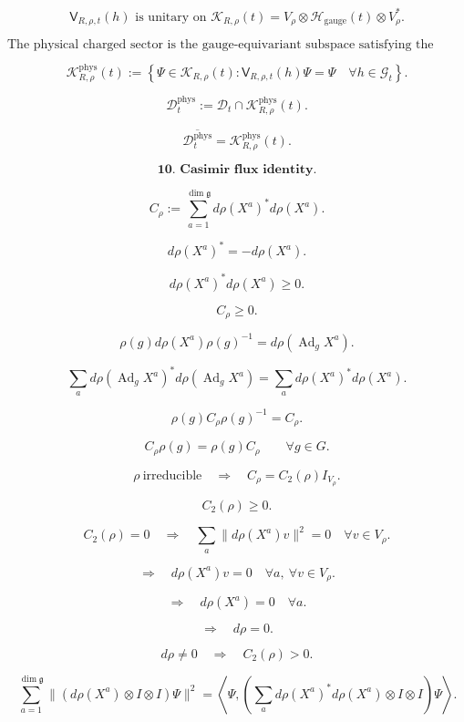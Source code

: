 \documentclass[11pt]{article}
\begin{document}
\[
\mathsf V_{R,\rho,t}(h)
\text{ is unitary on }
\mathcal K_{R,\rho}(t)
=
V_\rho\otimes\mathcal H_{\mathrm{gauge}}(t)\otimes V_\rho^\ast.
\]

\[
\text{The physical charged sector is the gauge-equivariant subspace satisfying the gauge constraint.}
\]

\[
\mathcal K_{R,\rho}^{\mathrm{phys}}(t)
:=
\left\{
\Psi\in \mathcal K_{R,\rho}(t):
\mathsf V_{R,\rho,t}(h)\Psi=\Psi
\quad
\forall h\in\mathcal G_t
\right\}.
\]

\[
\mathscr D_t^{\mathrm{phys}}
:=
\mathscr D_t\cap \mathcal K_{R,\rho}^{\mathrm{phys}}(t).
\]

\[
\overline{\mathscr D_t^{\mathrm{phys}}}
=
\mathcal K_{R,\rho}^{\mathrm{phys}}(t).
\]

\bigskip

\[
\textbf{10. Casimir flux identity.}
\]

\[
C_\rho
:=
\sum_{a=1}^{\dim\mathfrak g}
d\rho(X^a)^\ast d\rho(X^a).
\]

\[
d\rho(X^a)^\ast=-d\rho(X^a).
\]

\[
d\rho(X^a)^\ast d\rho(X^a)\ge0.
\]

\[
C_\rho\ge0.
\]

\[
\rho(g)d\rho(X^a)\rho(g)^{-1}
=
d\rho(\operatorname{Ad}_gX^a).
\]

\[
\sum_a
d\rho(\operatorname{Ad}_gX^a)^\ast
d\rho(\operatorname{Ad}_gX^a)
=
\sum_a
d\rho(X^a)^\ast d\rho(X^a).
\]

\[
\rho(g)C_\rho\rho(g)^{-1}
=
C_\rho.
\]

\[
C_\rho\rho(g)=\rho(g)C_\rho
\qquad
\forall g\in G.
\]

\[
\rho\ \text{irreducible}
\quad\Longrightarrow\quad
C_\rho=C_2(\rho)I_{V_\rho}.
\]

\[
C_2(\rho)\ge0.
\]

\[
C_2(\rho)=0
\quad\Longrightarrow\quad
\sum_a\|d\rho(X^a)v\|^2=0
\quad
\forall v\in V_\rho.
\]

\[
\Longrightarrow\quad
d\rho(X^a)v=0
\quad
\forall a,\ \forall v\in V_\rho.
\]

\[
\Longrightarrow\quad
d\rho(X^a)=0
\quad
\forall a.
\]

\[
\Longrightarrow\quad
d\rho=0.
\]

\[
d\rho\neq0
\quad\Longrightarrow\quad
C_2(\rho)>0.
\]

\[
\sum_{a=1}^{\dim\mathfrak g}
\|(d\rho(X^a)\otimes I\otimes I)\Psi\|^2
=
\left\langle
\Psi,
\left(
\sum_a d\rho(X^a)^\ast d\rho(X^a)
\otimes I\otimes I
\right)\Psi
\right\rangle.
\]
\end{document}
